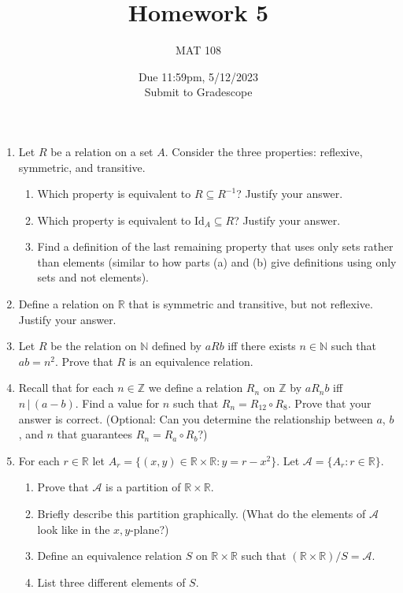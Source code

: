 \documentclass{article}
\title{Homework 5}
\author{MAT 108}
\date{Due 11:59pm, 5/12/2023\\ 
\vspace{0.1cm}
Submit to Gradescope}
\newcommand{\bR}{\mathbb{R}}
\newcommand{\bZ}{\mathbb{Z}}
\newcommand{\bN}{\mathbb{N}}
\begin{document}
\maketitle

{\large

\begin{enumerate}[labelindent=0pt,leftmargin=0pt]

    \setlength{\itemsep}{13pt} 

    \item Let $R$ be a relation on a set $A$. Consider the three properties: reflexive, symmetric, and transitive.\begin{enumerate}
    \item Which property is equivalent to $R\subseteq R^{-1}$? Justify your answer.
    \item Which property is equivalent to $\text{Id}_A\subseteq R$? Justify your answer.
    \item Find a definition of the last remaining property that uses only sets rather than elements (similar to how parts (a) and (b) give definitions using only sets and not elements). 
    \end{enumerate}
    

    \item Define a relation on $\bR$ that is symmetric and transitive, but not reflexive. Justify your answer.

    \item Let $R$ be the relation on $\bN$ defined by $a R b$ iff there exists $n\in\bN$ such that $ab=n^2$. Prove that $R$ is an equivalence relation.

    \item Recall that for each $n\in\bZ$ we define a relation $R_n$ on $\bZ$ by $a R_n b$ iff $n\,|\,(a-b)$. Find a value for $n$ such that $R_n=R_{12}\circ R_8$. Prove that your answer is correct. (Optional: Can you determine the relationship between $a$, $b$, and $n$ that guarantees $R_n=R_a\circ R_b$?)

    \item For each $r\in\bR$ let $A_r=\{(x,y)\in\bR\times\bR:y=r-x^2\}$. Let $\mathcal{A}=\{A_r:r\in\bR\}$.\begin{enumerate}
    \item Prove that $\mathcal{A}$ is a partition of $\bR\times\bR$.
    \item Briefly describe this partition graphically. (What do the elements of $\mathcal{A}$ look like in the $x,y$-plane?)
    \item Define an equivalence relation $S$ on $\bR\times\bR$ such that $(\bR\times\bR)/S=\mathcal{A}$.
    \item List three different elements of $S$.
    \end{enumerate}

    
    \end{enumerate}

}
\end{document}
